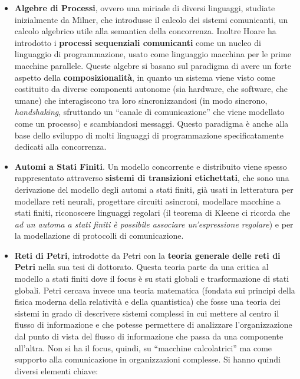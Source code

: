 \documentclass[a4paper,12pt, oneside]{book}
\begin{document}
\begin{itemize}
  \item \textbf{Algebre di Processi}, ovvero una miriade di diversi linguaggi,
  studiate inizialmente da Milner, che introdusse il calcolo dei sistemi
  comunicanti, un calcolo algebrico utile alla semantica della
  concorrenza. Inoltre Hoare ha introdotto i \textbf{processi sequenziali
    comunicanti} come un nucleo di linguaggio di programmazione, usato come
  linguaggio macchina per le prime macchine parallele. Queste algebre si basano
  sul paradigma di avere un forte aspetto della \textbf{composizionalità}, in
  quanto un sistema viene visto come costituito da diverse componenti autonome
  (sia hardware, che software, che umane) che interagiscono tra loro
  sincronizzandosi (in modo sincrono, \textit{handshaking}, sfruttando un ``canale di comunicazione''
  che viene modellato come un processo) e scambiandosi messaggi. Questo
  paradigma è anche alla base dello sviluppo di molti linguaggi di
  programmazione specificatamente dedicati alla concorrenza.
  \item \textbf{Automi a Stati Finiti}. Un modello concorrente e distribuito
  viene spesso rappresentato attraverso \textbf{sistemi di transizioni
    etichettati}, che sono una derivazione del modello degli automi a stati
  finiti, già usati in letteratura per modellare reti neurali, progettare
  circuiti asincroni, modellare macchine a stati finiti, riconoscere linguaggi
  regolari (il teorema di Kleene ci ricorda che \textit{ad un automa a stati
    finiti è possibile associare un'espressione regolare}) e per la modellazione
  di protocolli di comunicazione. 
  \item \textbf{Reti di Petri}, introdotte da Petri con la \textbf{teoria
    generale delle reti di Petri} nella sua tesi di dottorato. Questa teoria
  parte da una critica al modello a stati finiti dove il focus è su stati
  globali e trasformazione di stati globali. Petri cercava invece una teoria
  matematica (fondata sui principi della fisica moderna della relatività e della
  quantistica) che fosse una teoria dei sistemi in grado di descrivere sistemi
  complessi in cui mettere al centro il flusso di informazione e che potesse
  permettere di analizzare l'organizzazione dal punto di vista del flusso di
  informazione che passa da una componente all'altra. Non si ha il focus,
  quindi, su ``macchine calcolatrici'' ma come supporto alla comunicazione in
  organizzazioni complesse. Si hanno quindi diversi elementi chiave:
  \begin{itemize}

\end{itemize}
\end{itemize}
\end{document}
